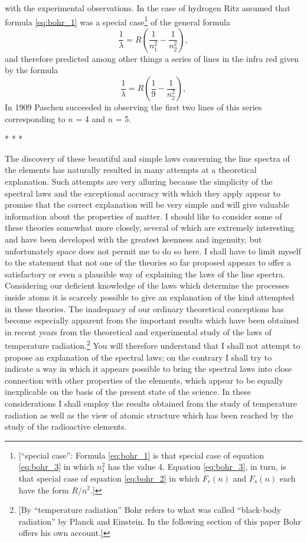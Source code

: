 with the experimental observations. In the case of hydrogen Ritz assumed
that formula \eqref{eq:bohr_1} was a special case\footnote{\label{fn:bohr_nden}{[}``special case'':
  Formula \eqref{eq:bohr_1} is that special case of equation \eqref{eq:bohr_3}
  in which $n_1^2$
  has the value 4. Equation \eqref{eq:bohr_3}, in turn, is that special case of equation
  \eqref{eq:bohr_2} in which $F_r(n)$ and $F_s(n)$ each have
  the form $R/n^2$.]} of the general formula
%
\begin{equation}\label{eq:bohr_3}
\frac{1}{\lambda} = R\left(\frac{1}{n_1^2} - \frac{1}{n_2^2}\right) ,
\end{equation}
%
and therefore predicted among other things a series of lines in the
infra red given by the formula
%
\begin{equation*}
\frac{1}{\lambda} = R\left(\frac{1}{9} - \frac{1}{n_2^2}\right) ,
\end{equation*}
%
In 1909 Paschen succeeded in observing the first two lines of this
series corresponding to $n$ = 4 and $n$ = 5.\\
\centerline{* * *}
%
The discovery of these beautiful and simple laws concerning the line
spectra of the elements has naturally resulted in many attempts at a
theoretical explanation. Such attempts are very alluring because the
simplicity of the spectral laws and the exceptional accuracy with which
they apply appear to promise that the correct explanation will be very
simple and will give valuable information about the properties of
matter. I should like to consider some of these theories somewhat more
closely, several of which are extremely interesting and have been
developed with the greatest keenness and ingenuity, but unfortunately
space does not permit me to do so here. I shall have to limit myself to
the statement that not one of the theories so far proposed appears to
offer a satisfactory or even a plausible way of explaining the laws of
the line spectra. Considering our deficient knowledge of the laws which
determine the processes inside atoms it is scarcely possible to give an
explanation of the kind attempted in these theories. The inadequacy of
our ordinary theoretical conceptions has become especially apparent from
the important results which have been obtained in recent years from the
theoretical and experimental study of the laws of temperature
radiation.\footnote{{[}By ``temperature radiation'' Bohr refers to what
  was called ``black-body radiation'' by Planck and Einstein. In the
  following section of this paper Bohr offers his own account.{]}} You
will therefore understand that I shall not attempt to propose an
explanation of the spectral laws; on the contrary I shall try to
indicate a way in which it appears possible to bring the spectral laws
into close connection with other properties of the elements, which
appear to be equally inexplicable on the basis of the present state of
the science. In these considerations I shall employ the results obtained
from the study of temperature radiation as well as the view of atomic
structure which has been reached by the study of the radioactive
elements.

